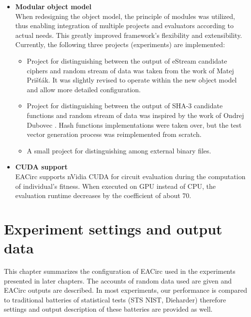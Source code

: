 \documentclass[12pt,twoside]{fithesis2}		%
\renewcommand{\_}{\leavevmode \kern0.0em\vbox{\hrule width0.4em}}
\newcommand{\squarebullet}{\textcolor{black}{\raisebox{0.15em}{\rule{4pt}{4pt}}}}
\newenvironment{myItemize}{
  \begin{itemize}[leftmargin=2em,rightmargin=1em,itemsep=\parskip ,parsep=0em,topsep=0em,partopsep=0em]
  \renewcommand{\labelitemi}{\squarebullet}
  \renewcommand{\labelitemii}{$\diamond$}
}{
  \end{itemize}
}
\begin{document}
\begin{myItemize}
and circumvents most parts of the EACirc framework, mainly the evolution and software circuit emulation.
The independence of this process is of utmost importance, since it provides supporting evidence for the achieved results.
\item \textbf{Modular object model}\\
When redesigning the object model, the principle of modules was utilized, thus enabling integration of multiple projects 
and evaluators according to actual needs. This greatly improved framework's flexibility and extensibility.
Currently, the following three projects (experiments) are implemented:
\begin{myItemize}
\item Project for distinguishing between the output of eStream candidate ciphers and random stream of data was taken from the work of 
Matej Prišťák. \parencite{thesis-pristak}
It was slightly revised to operate within the new object model and allow more detailed configuration.
\item Project for distinguishing between the output of SHA-3 candidate functions and random stream of data was inspired by the work of 
Ondrej Dubovec \parencite{thesis-dubovec}.
Hash functions implementations were taken over, but the test vector generation process was reimplemented from scratch. 
\item A small project for distinguishing among external binary files.
\end{myItemize}
\item \textbf{CUDA support}\\
EACirc supports nVidia CUDA for circuit evaluation during the computation of individual's fitness.
When executed on GPU instead of CPU, the evaluation runtime decreases by the coefficient of about 70.
\end{myItemize}

\chapter{Experiment settings and output data}
\label{chap:settings}

This chapter summarizes the configuration of EACirc used in the experiments presented in later chapters.
The accounts of random data used are given and EACirc outputs are described. 
In most experiments, our performance is compared to traditional batteries of statistical tests (STS NIST, Dieharder)
therefore settings and output description of these batteries are provided as well.
\end{document}
